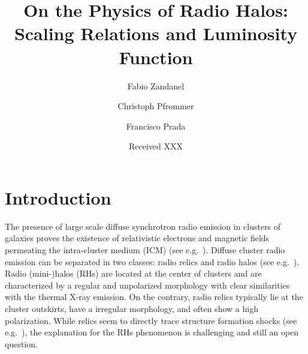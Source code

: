 \documentclass[traditabstract]{aa}
\begin{document}
\title{On the Physics of Radio Halos: Scaling Relations and Luminosity Function}

\author{
 Fabio Zandanel \and
 Christoph Pfrommer \and
 Francisco Prada
}

\date{Received XXX}





\maketitle


\section{Introduction}
\label{sec:1}
The presence of large scale diffuse synchrotron radio emission in clusters of galaxies proves the existence 
of relativistic electrons and magnetic fields permeating the intra-cluster medium (ICM) (see e.g.~\citealp{2004NewAR..48.1137F}).
\begingroup
\let\thefootnote\relax{}
\endgroup
Diffuse cluster radio emission can be separated in two classes: radio relics and radio halos (see e.g.~\citealp{2004rcfg.procE..25K,2008SSRv..134...93F}). 
Radio (mini-)halos (RHs) are located at the center of clusters and are characterized by a regular and unpolarized morphology with clear
similarities with the thermal X-ray emission. On the contrary, radio relics typically lie at the cluster outskirts, have a irregular
morphology, and often show a high polarization. While relics seem to directly trace structure formation shocks (see e.g.~\citealp{2011A&A...533A..35V}), 
the explanation for the RHs phenomenon is challenging and still an open question.
                                   
\end{document}
